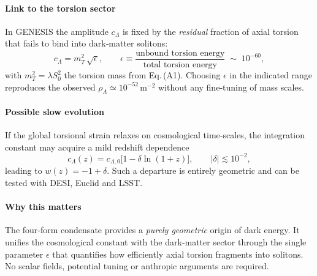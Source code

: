 \documentclass{article}
\begin{document}
\paragraph{Link to the torsion sector}
In GENESIS the amplitude $c_\Lambda$ is fixed by the \emph{residual} fraction of
axial torsion that fails to bind into dark‑matter solitons:
\begin{equation}\label{eq:cLambda}
  c_\Lambda = m_T^{2}\,\sqrt{\epsilon},
  \qquad
  \epsilon \equiv
  \frac{\text{unbound torsion energy}}{\text{total torsion energy}}
  \;\sim\;10^{-60},
\end{equation}
with $m_T^{2}=\lambda S_{0}^{2}$ the torsion mass from
Eq.\,(A1).  Choosing $\epsilon$ in the indicated range reproduces the observed
\(\rho_\Lambda\simeq10^{-52}\,\mathrm{m}^{-2}\) without any fine‑tuning of mass
scales.

\paragraph{Possible slow evolution}
If the global torsional strain relaxes on cosmological time‑scales, the
integration constant may acquire a mild redshift dependence
\begin{equation}\label{eq:runningc}
  c_\Lambda(z) = c_{\Lambda,0}\bigl[1-\delta\ln(1+z)\bigr],
  \qquad
  |\delta|\lesssim10^{-2},
\end{equation}
leading to
\(w(z) = -1 + \delta\).  
Such a departure is entirely geometric and can be tested with DESI,
Euclid and LSST.

\paragraph{Why this matters}
The four‑form condensate provides a \emph{purely geometric} origin of dark
energy.  It unifies the cosmological constant with the dark‑matter sector
through the single parameter \(\epsilon\) that quantifies how efficiently axial
torsion fragments into solitons.  No scalar fields, potential tuning or
anthropic arguments are required.

\medskip
\begin{center}
\end{center}
\end{document}
